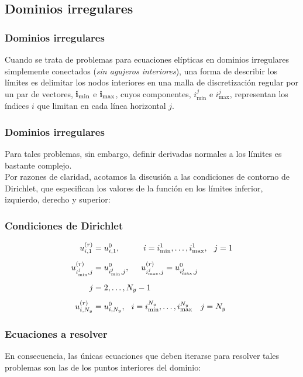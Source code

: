 \subsection{Dominios irregulares}
\begin{frame}
\frametitle{Dominios irregulares}
Cuando se trata de problemas para ecuaciones elípticas en dominios irregulares simplemente conectados (\emph{sin agujeros interiores}), una forma de describir los límites es delimitar los nodos interiores en una malla de discretización regular por un par de vectores, $\vb{i}_{\min}$ e $\vb{i}_{\max}$, cuyos componentes, $i_{\min}^{j}$ e $i_{\max}^{j}$, representan los índices $i$ que limitan en cada línea horizontal $j$.
\end{frame}
\begin{frame}
\frametitle{Dominios irregulares}
Para tales problemas, sin embargo, definir derivadas normales a los límites es bastante complejo.
\\
\bigskip
Por razones de claridad, acotamos la discusión a las condiciones de contorno de Dirichlet, que especifican los valores de la función en los límites inferior, izquierdo, derecho y superior:
\end{frame}
\begin{frame}
\frametitle{Condiciones de Dirichlet}
\begin{align}
\begin{aligned}
u_{i, 1}^{(r)} &= u_{i, 1}^{0}, \hspace{1cm} i = i_{\min}^{1}, \ldots, i_{\max}^{1}, \hspace{0.25cm} j = 1 \\[0.5em]
u_{i_{\min}^{j}, j}^{(r)} &= u_{i_{\min}^{j}, j}^{0}, \hspace{0.5cm} u_{i_{\max}^{j}, j}^{(r)} = u_{i_{\max}^{j}, j}^{0} \\[0.5em]
j &= 2, \ldots, N_{y} - 1 \\[0.5em]
u_{i, N_{y}}^{(r)} &= u_{i, N_{y}}^{0}, \hspace{0.25cm} i = i_{\min}^{N_{y}}, \ldots, i_{\max}^{N_{y}} \hspace{0.35cm} j = N_{y}
\end{aligned}
\label{eq:ecuacion_13_32}
\end{align}
\end{frame}
\begin{frame}
\frametitle{Ecuaciones a resolver}
En consecuencia, las únicas ecuaciones que deben iterarse para resolver tales problemas son las de los puntos interiores del dominio:
\end{frame}
